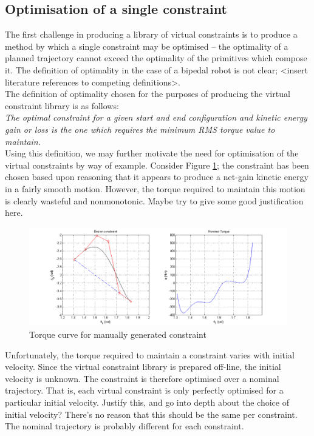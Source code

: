 \subsection{Optimisation of a single constraint}
The first challenge in producing a library of virtual constraints is to produce a method by which a single constraint may be optimised -- the optimality of a planned trajectory cannot exceed the optimality of the primitives which compose it. The definition of optimality in the case of a bipedal robot is not clear; {\color{red}<insert literature references to competing definitions>}. \\

The definition of optimality chosen for the purposes of producing the virtual constraint library is as follows: \\

\emph{The optimal constraint for a given start and end configuration and kinetic energy gain or loss is the one which requires the minimum RMS torque value to maintain.} \\

Using this definition, we may further motivate the need for optimisation of the virtual constraints by way of example. Consider Figure \ref{fig:manualgen}; the constraint has been chosen based upon reasoning that it appears to produce a net-gain kinetic energy in a fairly smooth motion. However, the torque required to maintain this motion is clearly wasteful and nonmonotonic. {\color{red} Maybe try to give some good justification here.}

\begin{figure}
	\centering
	\includegraphics[width=0.9\linewidth]{4VirtConstLib/manualgen.png}
	\caption{Torque curve for manually generated constraint}
	\label{fig:manualgen}
\end{figure}

Unfortunately, the torque required to maintain a constraint varies with initial velocity. Since the virtual constraint library is prepared off-line, the initial velocity is unknown. The constraint is therefore optimised over a nominal trajectory. That is, each virtual constraint is only perfectly optimised for a particular initial velocity. {\color{red} Justify this, and go into depth about the choice of initial velocity? There's no reason that this should be the same per constraint. The nominal trajectory is probably different for each constraint.}


